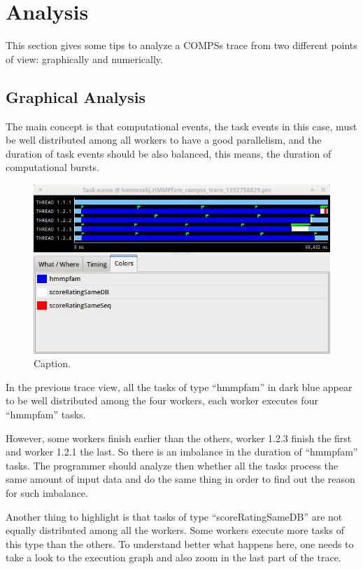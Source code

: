 \section{Analysis}
\label{sec:Analysis}
This section gives some tips to analyze a COMPSs trace from two different points of view:
graphically and numerically.

\subsection{Graphical Analysis}
The main concept is that computational events, the task events in this case, must be well 
distributed among all workers to have a good parallelism, and the duration of task events 
should be also balanced, this means, the duration of computational bursts.

\begin{figure}[ht!]
  \centering
    \includegraphics[width=1.0\textwidth]{./Sections/5_Analysis/Figures/8.jpeg}
    \caption{Caption.}
\end{figure}

In the previous trace view, all the tasks of type ``hmmpfam'' in dark blue appear to be well 
distributed among the four workers, each worker executes four ``hmmpfam'' tasks.

However, some workers finish earlier than the others, worker 1.2.3 finish the first and worker 1.2.1 
the last. So there is an imbalance in the duration of ``hmmpfam'' tasks. The programmer should 
analyze then whether all the tasks process the same amount of input data and do the same thing 
in order to find out the reason for such imbalance.

Another thing to highlight is that tasks of type ``scoreRatingSameDB'' are not equally distributed 
among all the workers. Some workers execute more tasks of this type than the others. 
To understand better what happens here, one needs to take a look to the execution graph and also zoom 
in the last part of the trace.

